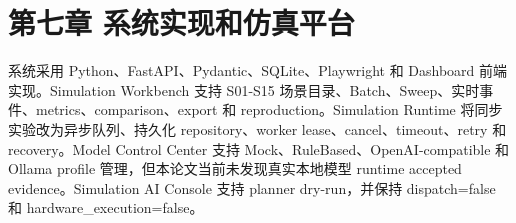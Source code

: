 \chapter{第七章 系统实现和仿真平台}

系统采用 Python、FastAPI、Pydantic、SQLite、Playwright 和 Dashboard 前端实现。Simulation Workbench 支持 S01-S15 场景目录、Batch、Sweep、实时事件、metrics、comparison、export 和 reproduction。Simulation Runtime 将同步实验改为异步队列、持久化 repository、worker lease、cancel、timeout、retry 和 recovery。Model Control Center 支持 Mock、RuleBased、OpenAI-compatible 和 Ollama profile 管理，但本论文当前未发现真实本地模型 runtime accepted evidence。Simulation AI Console 支持 planner dry-run，并保持 dispatch=false 和 hardware\_execution=false。\par

